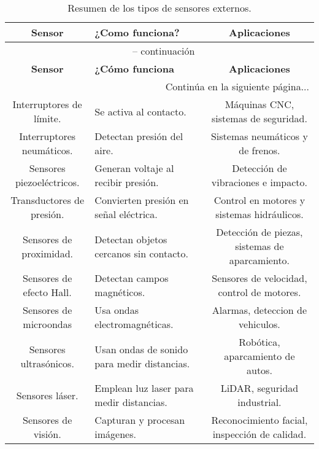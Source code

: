 \begin{longtable}{|c|p{10cm}|c|} %
	\caption{Resumen de los tipos de sensores externos.} \label{tab:ejemplo_tabla} \\
	\hline
	\textbf{Sensor} & \textbf{¿Como funciona?} & \textbf{Aplicaciones} \\
	\hline
	\endfirsthead
	\multicolumn{3}{c}{{\tablename\ \thetable{} -- continuación}} \\
	\hline
	\textbf{Sensor} & \textbf{¿Cómo funciona} & \textbf{Aplicaciones} \\
	\hline
	\endhead
	\hline \multicolumn{3}{r}{{Continúa en la siguiente página...}} \\
	\hline
	\endfoot
	\hline
	\endlastfoot
	Interruptores de límite. & Se activa al contacto. & Máquinas CNC, sistemas de seguridad. \\
	Interruptores neumáticos. & Detectan presión del aire. & Sistemas neumáticos y de frenos. \\
	Sensores piezoeléctricos. & Generan voltaje al recibir presión. & Detección de vibraciones e impacto. \\
	Transductores de presión. & Convierten presión en señal eléctrica. & Control en motores y sistemas hidráulicos. \\
	Sensores de proximidad. & Detectan objetos cercanos sin contacto. & Detección de piezas, sistemas de aparcamiento. \\
	Sensores de efecto Hall. & Detectan campos magnéticos. & Sensores de velocidad, control de motores. \\
	Sensores de microondas & Usa ondas electromagnéticas. & Alarmas, deteccion de vehiculos. \\
	Sensores ultrasónicos. & Usan ondas de sonido para medir distancias. & Robótica, aparcamiento de autos. \\
	Sensores láser. & Emplean luz laser para medir distancias. & LiDAR, seguridad industrial. \\
	Sensores de visión. & Capturan y procesan imágenes. & Reconocimiento facial, inspección de calidad. \\
\end{longtable}